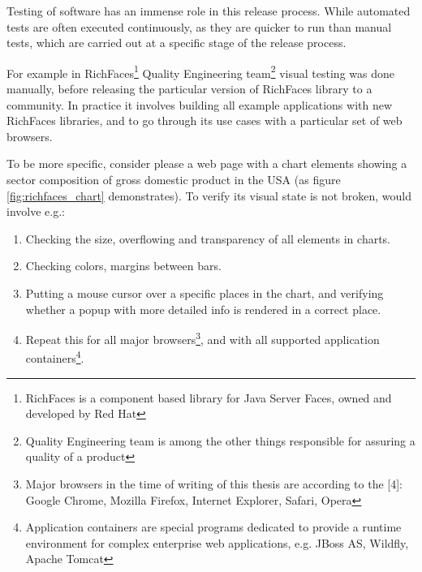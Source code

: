 \documentclass[11pt,oneside,final]{fithesis2}
\begin{document}
  Testing of software has an immense role in this release process. While automated tests are often executed continuously, as they are quicker to run than manual tests, 
  which are carried out at a specific stage of the release process.
  
  For example in RichFaces\footnote{RichFaces is a component based library for Java Server Faces, owned and developed by Red Hat} Quality Engineering 
  team\footnote{Quality Engineering team is among the other things responsible for assuring a quality of a product} visual testing was done manually, before releasing 
  the particular version of RichFaces library to a community. In practice it involves building all example applications with new RichFaces libraries, and to go 
  through its use cases with a particular set of web browsers. 
  
  To be more specific, consider please a web page with a chart elements showing a sector composition of gross domestic product in the USA (as figure \ref{fig:richfaces_chart} demonstrates).
  To verify its visual state is not broken, would involve e.g.:
  \begin{enumerate}
   \item Checking the size, overflowing and transparency of all elements in charts.
   \item Checking colors, margins between bars.
   \item Putting a mouse cursor over a specific places in the chart, and verifying whether a popup with more detailed info is rendered in a correct place.
   \item Repeat this for all major browsers\footnote{\label{footnote:majorBrowsers}Major browsers in the time of writing of this thesis are according to the [4]: Google Chrome, Mozilla Firefox, Internet Explorer, Safari, Opera}, 
   and with all supported application containers\footnote{Application containers are special programs 
   dedicated to provide a runtime environment for complex enterprise web applications, e.g. JBoss AS, Wildfly, Apache Tomcat}.
  \end{enumerate}
  
\end{document}
